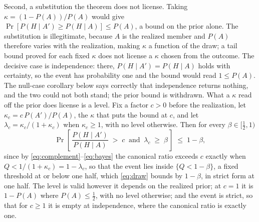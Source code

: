 Second, a substitution the theorem does not license. Taking $\kappa = (1 - P(A))/P(A)$ would give $\Pr[P(H \mid A') \ge P(H \mid A)] \le P(A)$, a bound on the prior alone. The substitution is illegitimate, because $A$ is the realized member and $P(A)$ therefore varies with the realization, making $\kappa$ a function of the draw; a tail bound proved for each fixed $\kappa$ does not license a $\kappa$ chosen from the outcome. The decisive case is independence: there, $P(H \mid A') = P(H \mid A)$ holds with certainty, so the event has probability one and the bound would read $1 \le P(A)$. The null-case corollary below says correctly that independence returns nothing, and the two could not both stand; the prior bound is withdrawn. What a $\kappa$ read off the prior does license is a level. Fix a factor $c > 0$ before the realization, let $\kappa_c = c\,P(A')/P(A)$, the $\kappa$ that puts the bound at $c$, and let $\lambda_c = \kappa_c/(1+\kappa_c)$ when $\kappa_c \ge 1$, with no level otherwise. Then for every $\beta \in [\tfrac12, 1)$
\begin{equation}
\label{eq:level-reading}
\Pr\!\left[\, \frac{P(H \mid A')}{P(H \mid A)} \;>\; c \ \text{ and } \ \lambda_c \;\ge\; \beta \,\right] \;\le\; 1 - \beta,
\end{equation}
since by \eqref{eq:complement}--\eqref{eq:bayes} the canonical ratio exceeds $c$ exactly when $Q < 1/(1+\kappa_c) = 1 - \lambda_c$, so that the event lies inside $\{Q < 1 - \beta\}$, a fixed threshold at or below one half, which \eqref{eq:draw} bounds by $1 - \beta$, in strict form at one half. The level is valid however it depends on the realized prior; at $c = 1$ it is $1 - P(A)$ where $P(A) \le \tfrac12$, with no level otherwise; and the event is strict, so that for $c \ge 1$ it is empty at independence, where the canonical ratio is exactly one.

